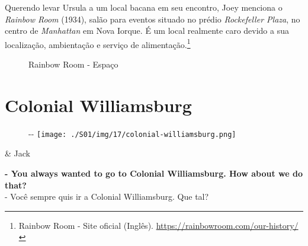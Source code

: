 Querendo levar Ursula a um local bacana em seu encontro, Joey menciona o
\emph{Rainbow Room} (1934), salão para eventos situado no prédio
\emph{Rockefeller Plaza}, no centro de \emph{Manhattan} em Nova Iorque.
É um local realmente caro devido a sua localização, ambientação e
serviço de alimentação.\footnote{\sloppy Rainbow Room - Site oficial (Inglês). \url{https://rainbowroom.com/our-history/}}

\begin{figure}
  \centering
    \caption{Rainbow Room - Espaço\label{fig:rainbow-room-espa-o}}
\end{figure}

\hypertarget{colonial-williamsburg}{%
\section{Colonial Williamsburg}\label{colonial-williamsburg}}

\begin{figure}[!ht]
  \begin{adjustwidth}{-\oddsidemargin-1in}{-\rightmargin}
    \centering
    \texttt{[image: ./S01/img/17/colonial-williamsburg.png]}
  \end{adjustwidth}
\end{figure}

\begin{tcolorbox}[enhanced,center upper,
    drop fuzzy shadow southeast, boxrule=0.3pt,
    lower separated=false, breakable,
    colframe=black!30!dialogoBorder,colback=white]
\begin{minipage}[c]{0.16\linewidth}
   & \centering \scriptsize{Jack}
\end{minipage}
\hfill
\begin{minipage}[c]{0.8\linewidth}
  \textbf{- You always wanted to go to Colonial Williamsburg. How about we do that?}\\
  - Você sempre quis ir a Colonial Williamsburg. Que tal?
\end{minipage}
\end{tcolorbox}

